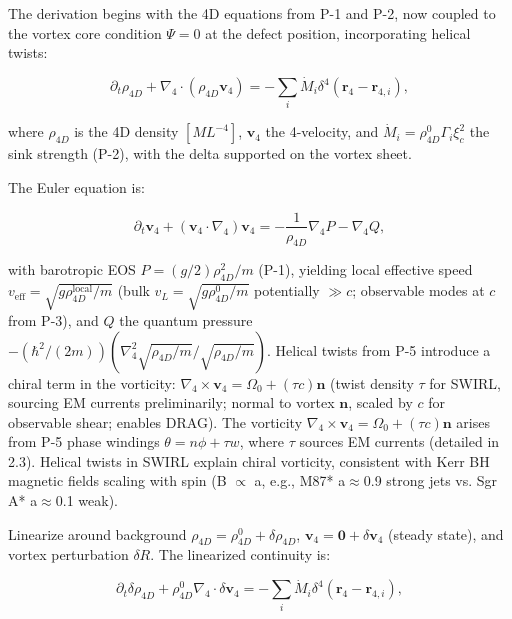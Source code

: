 The derivation begins with the 4D equations from P-1 and P-2, now coupled to the vortex core condition $\Psi=0$ at the defect position, incorporating helical twists:

\begin{equation}
\partial_t \rho_{4D} + \nabla_4 \cdot (\rho_{4D} \mathbf{v}_4) = -\sum_i \dot{M}_i \delta^4(\mathbf{r}_4 - \mathbf{r}_{4,i}),
\end{equation}

where $\rho_{4D}$ is the 4D density $[M L^{-4}]$, $\mathbf{v}_4$ the 4-velocity, and $\dot{M}_i = \rho_{4D}^0 \Gamma_i \xi_c^2$ the sink strength (P-2), with the delta supported on the vortex sheet.

The Euler equation is:

\begin{equation}
\partial_t \mathbf{v}_4 + (\mathbf{v}_4 \cdot \nabla_4) \mathbf{v}_4 = -\frac{1}{\rho_{4D}} \nabla_4 P - \nabla_4 Q,
\end{equation}

with barotropic EOS $P = (g/2) \rho_{4D}^2 / m$ (P-1), yielding local effective speed $v_{\text{eff}} = \sqrt{g \rho_{4D}^{\text{local}} / m}$ (bulk $v_L = \sqrt{g \rho_{4D}^0 / m}$ potentially $\gg c$; observable modes at $c$ from P-3), and $Q$ the quantum pressure $-(\hbar^2 / (2m)) (\nabla_4^2 \sqrt{\rho_{4D}/m} / \sqrt{\rho_{4D}/m})$. Helical twists from P-5 introduce a chiral term in the vorticity: $\nabla_4 \times \mathbf{v}_4 = \Omega_0 + (\tau c) \mathbf{n}$ (twist density $\tau$ for SWIRL, sourcing EM currents preliminarily; normal to vortex $\mathbf{n}$, scaled by $c$ for observable shear; enables DRAG). The vorticity $\nabla_4 \times \mathbf{v}_4 = \Omega_0 + (\tau c) \mathbf{n}$ arises from P-5 phase windings $\theta = n\phi + \tau w$, where $\tau$ sources EM currents (detailed in 2.3). Helical twists in SWIRL explain chiral vorticity, consistent with Kerr BH magnetic fields scaling with spin (B $\propto$ a, e.g., M87* a$\approx$0.9 strong jets vs. Sgr A* a$\approx$0.1 weak).

Linearize around background $\rho_{4D} = \rho_{4D}^0 + \delta \rho_{4D}$, $\mathbf{v}_4 = \mathbf{0} + \delta \mathbf{v}_4$ (steady state), and vortex perturbation $\delta R$. The linearized continuity is:

\begin{equation}
\partial_t \delta \rho_{4D} + \rho_{4D}^0 \nabla_4 \cdot \delta \mathbf{v}_4 = -\sum_i \dot{M}_i \delta^4(\mathbf{r}_4 - \mathbf{r}_{4,i}),
\end{equation}

